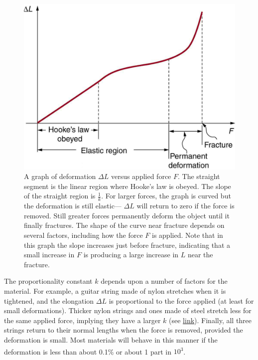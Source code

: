 \documentclass[
]{book}
\begin{document}
\begin{figure}
\hypertarget{import-auto-id1165298678464}{%
\centering
\includegraphics{images/Figure_06_03_01a.jpg}
\caption{A graph of deformation \({\Delta L}{}\) versus applied force \(F{}\). The
straight segment is the linear region where Hooke's law is obeyed. The
slope of the straight region is \(\frac{1}{k}{}\). For larger forces, the
graph is curved but the deformation is still elastic--- \({\Delta L}{}\)
will return to zero if the force is removed. Still greater forces
permanently deform the object until it finally fractures. The shape of
the curve near fracture depends on several factors, including how the
force \(F{}\) is applied. Note that in this graph the slope increases just
before fracture, indicating that a small increase in \(F{}\) is producing
a large increase in \(L{}\) near the
fracture.}\label{import-auto-id1165298678464}
}
\end{figure}

The proportionality constant \(k{}\) depends upon a number of factors for
the material. For example, a guitar string made of nylon stretches when
it is tightened, and the elongation \({\Delta L}{}\) is proportional to
the force applied (at least for small deformations). Thicker nylon
strings and ones made of steel stretch less for the same applied force,
implying they have a larger \(k{}\) (see
\protect\hyperlink{import-auto-id1165296232089}{link}). Finally,
all three strings return to their normal lengths when the force is
removed, provided the deformation is small. Most materials will behave
in this manner if the deformation is less than about 0.1\% or about 1
part in \(\text{10}^{3}{}\)\textsuperscript{}.
\end{document}

